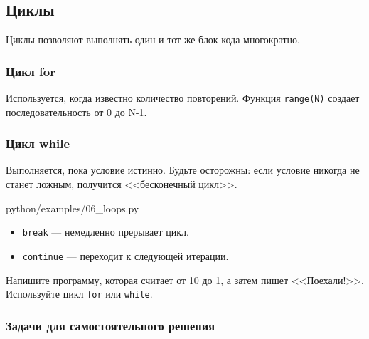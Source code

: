 \subsection{Циклы}

Циклы позволяют выполнять один и тот же блок кода многократно.

\subsubsection*{Цикл for}
Используется, когда известно количество повторений. Функция \texttt{range(N)} создает последовательность от 0 до N-1.

\subsubsection*{Цикл while}
Выполняется, пока условие истинно. Будьте осторожны: если условие никогда не станет ложным, получится <<бесконечный цикл>>.

\begin{codefile}[python]{python/examples/06_loops.py}
\end{codefile}

\begin{itemize}
    \item \texttt{break} — немедленно прерывает цикл.
    \item \texttt{continue} — переходит к следующей итерации.
\end{itemize}

\begin{taskbox}
Напишите программу, которая считает от 10 до 1, а затем пишет <<Поехали!>>. Используйте цикл \texttt{for} или \texttt{while}.
\end{taskbox}

\subsubsection*{Задачи для самостоятельного решения}

